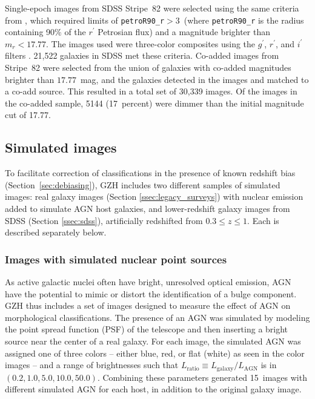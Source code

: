\documentclass[twocolumn]{aastex6}
\begin{document}
Single-epoch images from SDSS Stripe~82 were selected using the same criteria
from \citet{wil13}, which required limits of \texttt{petroR90\_r}$ >
3$\arcsec~(where \texttt{petroR90\_r} is the radius containing 90\% of the
$r^\prime$ Petrosian flux) and a magnitude brighter than $m_r < 17.77$. The
images used were three-color composites using the $g^\prime$, $r^\prime$, and
$i^\prime$ filters \citep{nie04}. 21,522 galaxies in SDSS met these criteria.
Co-added images from Stripe~82 were selected from the union of galaxies with
co-added magnitudes brighter than $17.77$~mag, and the galaxies detected in the
\stripe{} images and matched to a co-add source. This resulted in a total
set of 30,339 images. Of the images in the co-added sample, 5144 (17~percent)
were dimmer than the initial magnitude cut of 17.77. 


\subsection{Simulated \hst{} images}\label{ssec:simulatedimages}

To facilitate correction of classifications in the presence of known redshift
bias (Section~\ref{sec:debiasing}), GZH includes two different samples of
simulated \hst{} images: real \hst{} galaxy images (Section
\ref{ssec:legacy_surveys}) with nuclear emission added to simulate AGN host
galaxies, and lower-redshift galaxy images from SDSS (Section \ref{ssec:sdss}),
artificially redshifted from $0.3 \leq z \leq 1$.  Each is described separately
below. 

\subsubsection{Images with simulated nuclear point sources}\label{ssec:sim_agn}

As active galactic nuclei often have bright, unresolved optical emission, AGN
have the potential to mimic or distort the identification of a bulge component.
GZH thus includes a set of images designed to measure the effect of AGN on
morphological classifications.  The presence of an AGN was simulated by
modeling the point spread function (PSF) of the telescope and then inserting a
bright source near the center of a real galaxy. For each image, the simulated
AGN was assigned one of three colors -- either blue, red, or flat (white) as
seen in the color images -- and a range of brightnesses such that
$L_\mathrm{ratio} \equiv L_\mathrm{galaxy}/L_\mathrm{AGN}$ is in
$(0.2,1.0,5.0,10.0,50.0)$. Combining these parameters generated 15~images
with different simulated AGN for each host, in addition to the original galaxy
image. 
\end{document}
